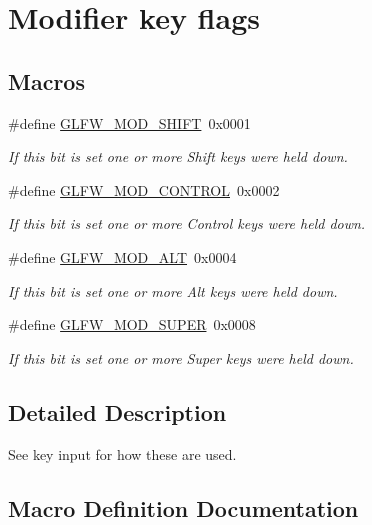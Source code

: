 \hypertarget{group__mods}{}\section{Modifier key flags}
\label{group__mods}
\subsection*{Macros}
\begin{DoxyCompactItemize}
\item 
\#define \hyperlink{group__mods_ga14994d3196c290aaa347248e51740274}{G\+L\+F\+W\+\_\+\+M\+O\+D\+\_\+\+S\+H\+I\+F\+T}~0x0001
\begin{DoxyCompactList}\small\item\em If this bit is set one or more Shift keys were held down. \end{DoxyCompactList}\item 
\#define \hyperlink{group__mods_ga6ed94871c3208eefd85713fa929d45aa}{G\+L\+F\+W\+\_\+\+M\+O\+D\+\_\+\+C\+O\+N\+T\+R\+O\+L}~0x0002
\begin{DoxyCompactList}\small\item\em If this bit is set one or more Control keys were held down. \end{DoxyCompactList}\item 
\#define \hyperlink{group__mods_gad2acd5633463c29e07008687ea73c0f4}{G\+L\+F\+W\+\_\+\+M\+O\+D\+\_\+\+A\+L\+T}~0x0004
\begin{DoxyCompactList}\small\item\em If this bit is set one or more Alt keys were held down. \end{DoxyCompactList}\item 
\#define \hyperlink{group__mods_ga6b64ba10ea0227cf6f42efd0a220aba1}{G\+L\+F\+W\+\_\+\+M\+O\+D\+\_\+\+S\+U\+P\+E\+R}~0x0008
\begin{DoxyCompactList}\small\item\em If this bit is set one or more Super keys were held down. \end{DoxyCompactList}\end{DoxyCompactItemize}


\subsection{Detailed Description}
See key input for how these are used. 

\subsection{Macro Definition Documentation}
\hypertarget{group__mods_gad2acd5633463c29e07008687ea73c0f4}{}
